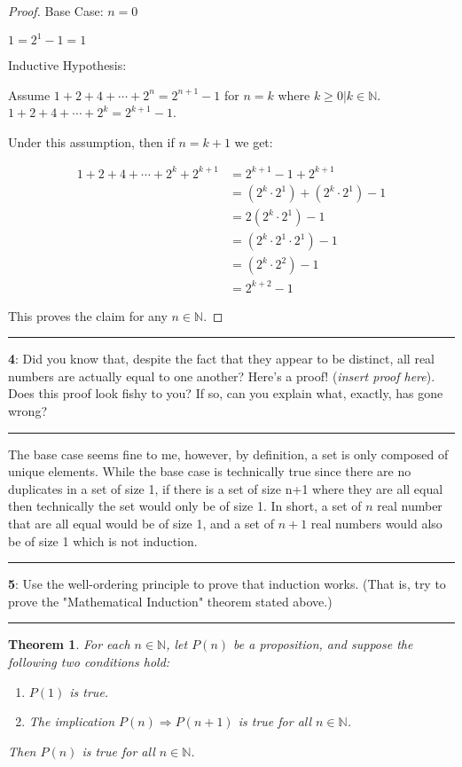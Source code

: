 \documentclass[11pt]{article}
\newtheorem{theorem}{Theorem}
\newcommand\question[2]{\vspace{.25in}\hrule\textbf{#1}: #2\vspace{.5em}\hrule\vspace{.10in}}
\newcommand{\N}{\mathbb{N}}
\begin{document}
\begin{proof}
	Base Case: $n=0$

	$1 = 2^1 - 1 = 1$

	Inductive Hypothesis:

	Assume $1 + 2 + 4 + \cdots + 2^n = 2^{n+1}-1$ for $n=k$ where $k \ge 0 | k \in \N$. $1 + 2 + 4 + \cdots + 2^k = 2^{k+1}-1$.

	Under this assumption, then if $n=k+1$ we get:

	\begin{align*}
		1 + 2 + 4 + \cdots + 2^k + 2^{k+1} &= 2^{k+1} - 1 + 2^{k+1}\\
		&= (2^k \cdot 2^1) + (2^k \cdot 2^1) - 1\\
		&= 2 ( 2^k \cdot 2^1) -1\\
		&= (2^k \cdot 2^1 \cdot 2^1) - 1\\
		&= (2^k \cdot 2^2) -1\\
		&= 2^{k+2} - 1
	\end{align*}

	This proves the claim for any $n \in \N$.
\end{proof}

\question{4}{Did you know that, despite the fact that they appear to be distinct, all real numbers are actually equal to one another? Here's a proof! (\textit{insert proof here}). Does this proof look fishy to you? If so, can you explain what, exactly, has gone wrong?}

The base case seems fine to me, however, by definition, a set is only composed of unique elements. While the base case is technically true since there are no duplicates in a set of size 1, if there is a set of size n+1 where they are all equal then technically the set would only be of size 1. In short, a set of $n$ real number that are all equal would be of size 1, and a set of $n+1$ real numbers would also be of size 1 which is not induction.

\newpage
\question{5}{Use the well-ordering principle to prove that induction works. (That is, try to prove the "Mathematical Induction" theorem stated above.)}

\begin{theorem}
	For each $n \in \N$, let $P(n)$ be a proposition, and suppose the following two conditions hold:
	\begin{enumerate}
	\item $P(1)$ is true.
	\item The implication $P(n) \Rightarrow P(n+1)$ is true for all $n \in \N$.
	\end{enumerate}

	Then $P(n)$ is true for all $n \in \N$.
\end{theorem}
\end{document}
